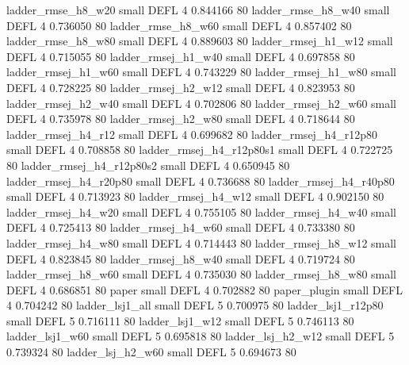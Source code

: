       ladder_rmse_h8_w20      small     DEFL                 4 0.844166 80
      ladder_rmse_h8_w40      small     DEFL                 4 0.736050 80
      ladder_rmse_h8_w60      small     DEFL                 4 0.857402 80
      ladder_rmse_h8_w80      small     DEFL                 4 0.889603 80
     ladder_rmsej_h1_w12      small     DEFL                 4 0.715055 80
     ladder_rmsej_h1_w40      small     DEFL                 4 0.697858 80
     ladder_rmsej_h1_w60      small     DEFL                 4 0.743229 80
     ladder_rmsej_h1_w80      small     DEFL                 4 0.728225 80
     ladder_rmsej_h2_w12      small     DEFL                 4 0.823953 80
     ladder_rmsej_h2_w40      small     DEFL                 4 0.702806 80
     ladder_rmsej_h2_w60      small     DEFL                 4 0.735978 80
     ladder_rmsej_h2_w80      small     DEFL                 4 0.718644 80
     ladder_rmsej_h4_r12      small     DEFL                 4 0.699682 80
  ladder_rmsej_h4_r12p80      small     DEFL                 4 0.708858 80
ladder_rmsej_h4_r12p80s1      small     DEFL                 4 0.722725 80
ladder_rmsej_h4_r12p80s2      small     DEFL                 4 0.650945 80
  ladder_rmsej_h4_r20p80      small     DEFL                 4 0.736688 80
  ladder_rmsej_h4_r40p80      small     DEFL                 4 0.713923 80
     ladder_rmsej_h4_w12      small     DEFL                 4 0.902150 80
     ladder_rmsej_h4_w20      small     DEFL                 4 0.755105 80
     ladder_rmsej_h4_w40      small     DEFL                 4 0.725413 80
     ladder_rmsej_h4_w60      small     DEFL                 4 0.733380 80
     ladder_rmsej_h4_w80      small     DEFL                 4 0.714443 80
     ladder_rmsej_h8_w12      small     DEFL                 4 0.823845 80
     ladder_rmsej_h8_w40      small     DEFL                 4 0.719724 80
     ladder_rmsej_h8_w60      small     DEFL                 4 0.735030 80
     ladder_rmsej_h8_w80      small     DEFL                 4 0.686851 80
                   paper      small     DEFL                 4 0.702882 80
            paper_plugin      small     DEFL                 4 0.704242 80
         ladder_lsj1_all      small     DEFL                 5 0.700975 80
      ladder_lsj1_r12p80      small     DEFL                 5 0.716111 80
         ladder_lsj1_w12      small     DEFL                 5 0.746113 80
         ladder_lsj1_w60      small     DEFL                 5 0.695818 80
       ladder_lsj_h2_w12      small     DEFL                 5 0.739324 80
       ladder_lsj_h2_w60      small     DEFL                 5 0.694673 80
